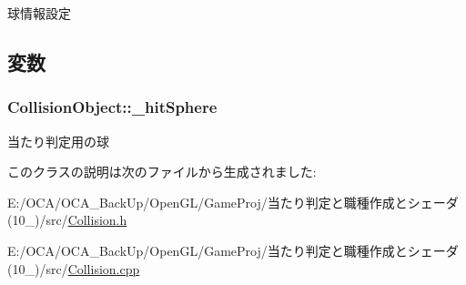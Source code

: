 球情報設定 



\subsection{変数}
\hypertarget{class_collision_object_afd1c8612ad380f08cf3f2a5bf4b3daab}{
\subsubsection[{\-\_\-hit\-Sphere}]{ Collision\-Object\-::\-\_\-hit\-Sphere\hspace{0.3cm}{\ttfamily [protected]}}}\label{class_collision_object_afd1c8612ad380f08cf3f2a5bf4b3daab}


当たり判定用の球 



このクラスの説明は次のファイルから生成されました\-:\begin{DoxyCompactItemize}
\item 
E\-:/\-O\-C\-A/\-O\-C\-A\-\_\-\-Back\-Up/\-Open\-G\-L/\-Game\-Proj/当たり判定と職種作成とシェーダ(10\-\_)/src/\hyperlink{_collision_8h}{Collision.\-h}\item 
E\-:/\-O\-C\-A/\-O\-C\-A\-\_\-\-Back\-Up/\-Open\-G\-L/\-Game\-Proj/当たり判定と職種作成とシェーダ(10\-\_)/src/\hyperlink{_collision_8cpp}{Collision.\-cpp}\end{DoxyCompactItemize}
